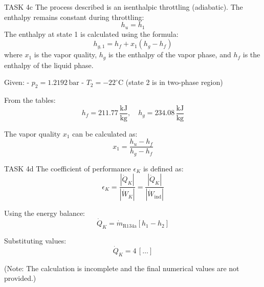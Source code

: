 TASK 4c  
The process described is an isenthalpic throttling (adiabatic). The enthalpy remains constant during throttling:  
\[
h_u = h_1
\]  
The enthalpy at state 1 is calculated using the formula:  
\[
h_{g,1} = h_f + x_1 (h_g - h_f)
\]  
where \( x_1 \) is the vapor quality, \( h_g \) is the enthalpy of the vapor phase, and \( h_f \) is the enthalpy of the liquid phase.  

Given:  
- \( p_2 = 1.2192 \, \text{bar} \)  
- \( T_2 = -22^\circ\text{C} \) (state 2 is in two-phase region)  

From the tables:  
\[
h_f = 211.77 \, \frac{\text{kJ}}{\text{kg}}, \quad h_g = 234.08 \, \frac{\text{kJ}}{\text{kg}}
\]  

The vapor quality \( x_1 \) can be calculated as:  
\[
x_1 = \frac{h_u - h_f}{h_g - h_f}
\]  

TASK 4d  
The coefficient of performance \( \epsilon_K \) is defined as:  
\[
\epsilon_K = \frac{|\dot{Q}_K|}{|\dot{W}_K|} = \frac{|\dot{Q}_K|}{|\dot{W}_{\text{ind}}|}
\]  

Using the energy balance:  
\[
\dot{Q}_K = \dot{m}_{\text{R134a}} \left[ h_1 - h_2 \right]
\]  

Substituting values:  
\[
\dot{Q}_K = 4 \, \left[ \ldots \right]
\]  

(Note: The calculation is incomplete and the final numerical values are not provided.)